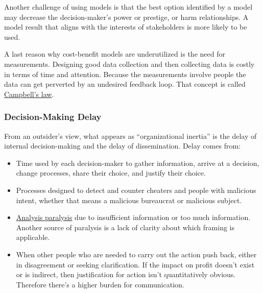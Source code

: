 Another challenge of using models is that the best option identified by a model may decrease the decision-maker's power or prestige, or harm relationships. A model result that aligns with the interests of stakeholders is more likely to be used.

A last reason why cost-benefit models are underutilized is the need for measurements. Designing good data collection and then collecting data is costly in terms of time and attention. Because the measurements involve people the data can get perverted by an undesired feedback loop. That concept is called \href{https://en.wikipedia.org/wiki/Campbell\%27s_law}{Campbell's law}. 

\subsubsection*{Decision-Making Delay\label{sec:decision-delay}}

From an outsider's view, what appears as ``organizational inertia'' is the delay of internal decision-making and the delay of dissemination. 
Delay comes from:
\begin{itemize}
    \item Time used by each decision-maker to gather information, arrive at a decision, change processes, share their choice, and justify their choice. 
    \item Processes designed to detect and counter cheaters and people with malicious intent, whether that means a malicious bureaucrat or malicious subject. 
\item \href{https://en.wikipedia.org/wiki/Analysis_paralysis}{Analysis paralysis} 
\iftoggle{WPinmargin}{\marginpar{$>$Wikipedia: Analysis paralysis}}{}
due to insufficient information or too much information. Another source  of paralysis is a lack of clarity about which framing is applicable.
\item When other people who are needed to carry out the action push back, either in disagreement or seeking clarification. If the impact on profit doesn't exist or is indirect, then justification for action isn't quantitatively obvious. Therefore there's a higher burden for communication.
\end{itemize}

